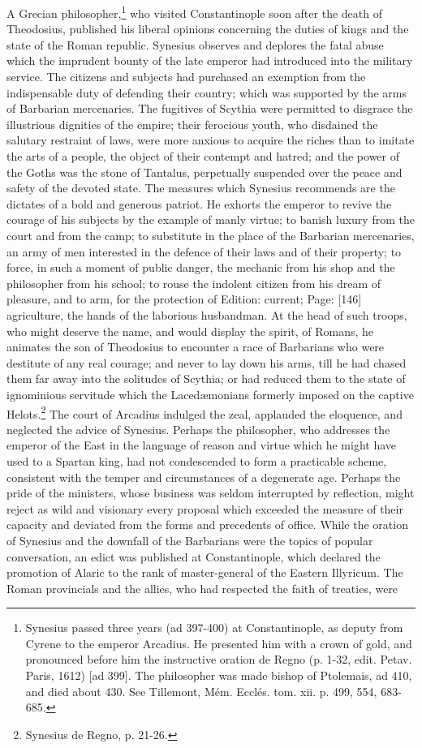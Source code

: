 A Grecian philosopher,\footnote{Synesius passed three years (ad 397-400) at Constantinople, as deputy from Cyrene to the emperor Arcadius. He presented him with a crown of gold, and pronounced before him the instructive oration de Regno (p. 1-32, edit. Petav. Paris, 1612) [ad 399]. The philosopher was made bishop of Ptolemais, ad 410, and died about 430. See Tillemont, Mém. Ecclés. tom. xii. p. 499, 554, 683-685.} who visited Constantinople soon after the death of Theodosius, published his liberal opinions concerning the duties of kings and the state of the Roman republic. Synesius observes and deplores the fatal abuse which the imprudent bounty of the late emperor had introduced into the military service. The citizens and subjects had purchased an exemption from the indispensable duty of defending their country; which was supported by the arms of Barbarian mercenaries. The fugitives of Scythia were permitted to disgrace the illustrious dignities of the empire; their ferocious youth, who disdained the salutary restraint of laws, were more anxious to acquire the riches than to imitate the arts of a people, the object of their contempt and hatred; and the power of the Goths was the stone of Tantalus, perpetually suspended over the peace and safety of the devoted state. The measures which Synesius recommends are the dictates of a bold and generous patriot. He exhorts the emperor to revive the courage of his subjects by the example of manly virtue; to banish luxury from the court and from the camp; to substitute in the place of the Barbarian mercenaries, an army of men interested in the defence of their laws and of their property; to force, in such a moment of public danger, the mechanic from his shop and the philosopher from his school; to rouse the indolent citizen from his dream of pleasure, and to arm, for the protection of Edition: current; Page: [146] agriculture, the hands of the laborious husbandman. At the head of such troops, who might deserve the name, and would display the spirit, of Romans, he animates the son of Theodosius to encounter a race of Barbarians who were destitute of any real courage; and never to lay down his arms, till he had chased them far away into the solitudes of Scythia; or had reduced them to the state of ignominious servitude which the Lacedæmonians formerly imposed on the captive Helots.\footnote{Synesius de Regno, p. 21-26.} The court of Arcadius indulged the zeal, applauded the eloquence, and neglected the advice of Synesius. Perhaps the philosopher, who addresses the emperor of the East in the language of reason and virtue which he might have used to a Spartan king, had not condescended to form a practicable scheme, consistent with the temper and circumstances of a degenerate age. Perhaps the pride of the ministers, whose business was seldom interrupted by reflection, might reject as wild and visionary every proposal which exceeded the measure of their capacity and deviated from the forms and precedents of office. While the oration of Synesius and the downfall of the Barbarians were the topics of popular conversation, an edict was published at Constantinople, which declared the promotion of Alaric to the rank of master-general of the Eastern Illyricum. The Roman provincials and the allies, who had respected the faith of treaties, were 